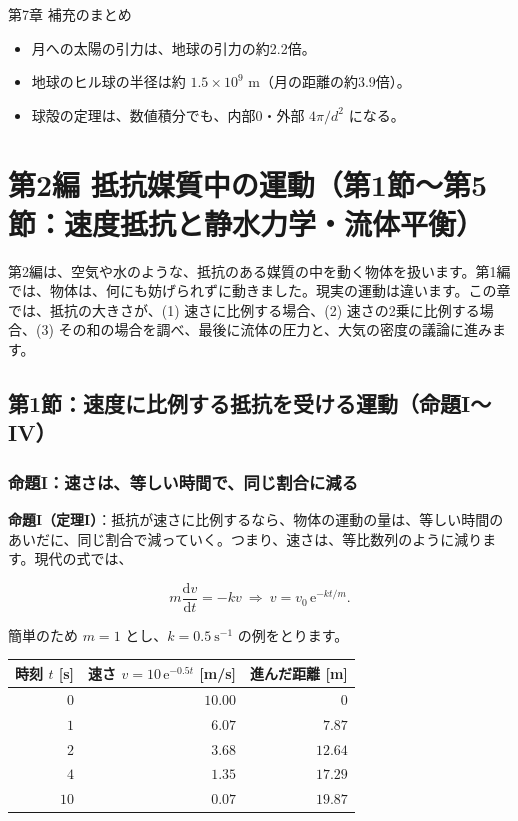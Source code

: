 \documentclass[a4paper,11pt,openany]{ltjsbook}
\newcommand{\dd}{\mathrm{d}}
\newcommand{\ee}{\mathrm{e}}
\begin{document}
\begin{pointbox}{第7章 補充のまとめ}
\begin{itemize}[leftmargin=*]
\item 月への太陽の引力は、地球の引力の約2.2倍。
\item 地球のヒル球の半径は約 $1.5\times10^9$ m（月の距離の約3.9倍）。
\item 球殻の定理は、数値積分でも、内部0・外部 $4\pi/d^2$ になる。
\end{itemize}
\end{pointbox}

\chapter{第2編 抵抗媒質中の運動（第1節〜第5節：速度抵抗と静水力学・流体平衡）}

第2編は、空気や水のような、抵抗のある媒質の中を動く物体を扱います。第1編では、物体は、何にも妨げられずに動きました。現実の運動は違います。この章では、抵抗の大きさが、(1) 速さに比例する場合、(2) 速さの2乗に比例する場合、(3) その和の場合を調べ、最後に流体の圧力と、大気の密度の議論に進みます。

\section{第1節：速度に比例する抵抗を受ける運動（命題I〜IV）}

\subsection{命題I：速さは、等しい時間で、同じ割合に減る}

\textbf{命題I（定理I）}：抵抗が速さに比例するなら、物体の運動の量は、等しい時間のあいだに、同じ割合で減っていく。つまり、速さは、等比数列のように減ります。現代の式では、

\[
m\frac{\dd v}{\dd t}=-kv\ \Longrightarrow\ v=v_0\,\ee^{-kt/m}.
\]

簡単のため $m=1$ とし、$k=0.5\ \mathrm{s^{-1}}$ の例をとります。

\begin{center}
\begin{tabular}{rrr}
\toprule
時刻 $t$ [s] & 速さ $v=10\,\ee^{-0.5t}$ [m/s] & 進んだ距離 [m]\\
\midrule
$0$ & $10.00$ & $0$\\
$1$ & $6.07$ & $7.87$\\
$2$ & $3.68$ & $12.64$\\
$4$ & $1.35$ & $17.29$\\
$10$ & $0.07$ & $19.87$\\
\bottomrule
\end{tabular}
\end{center}
\end{document}
